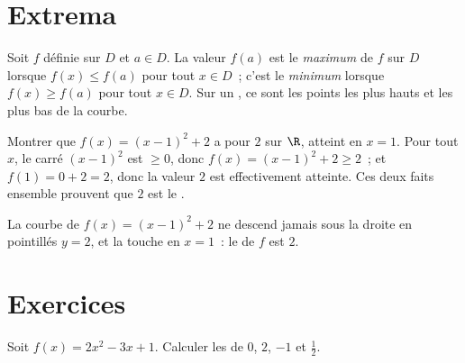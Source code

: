 \section{Extrema}

\begin{definition}\label{def:g10:functions:extrema}
Soit $f$ définie sur $D$ et $a \in D$. La valeur $f(a)$ est le
\emph{maximum} de $f$ sur $D$ lorsque $f(x) \leq f(a)$
pour tout $x \in D$~; c'est le \emph{minimum} lorsque
$f(x) \geq f(a)$ pour tout $x \in D$. Sur un , ce sont les points
les plus hauts et les plus bas de la courbe.
\end{definition}

\begin{example}\label{ex:g10:functions:extremum}
Montrer que $f(x) = (x - 1)^2 + 2$ a pour  $2$ sur $\R$, atteint
en $x = 1$. Pour tout $x$, le carré $(x-1)^2$ est $\geq 0$, donc
$f(x) = (x-1)^2 + 2 \geq 2$~; et $f(1) = 0 + 2 = 2$, donc la valeur $2$ est
effectivement atteinte. Ces deux faits ensemble prouvent que $2$ est le
.
\end{example}

\begin{omfigure}

{\small La courbe de $f(x) = (x-1)^2 + 2$ ne descend jamais sous la droite
en pointillés $y = 2$, et la touche en $x = 1$~: le  de $f$ est
$2$.}
\end{omfigure}

\section{Exercices}

\begin{exercise}[$\star$]\label{exo:g10:functions:1}
Soit $f(x) = 2x^2 - 3x + 1$. Calculer les  de $0$, $2$, $-1$ et
$\frac12$.
\end{exercise}

